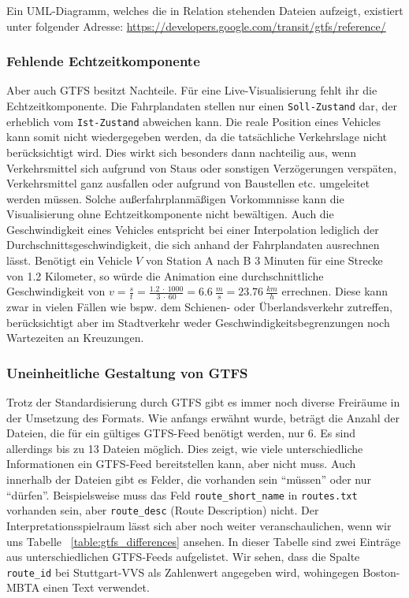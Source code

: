       Ein UML-Diagramm, welches die in Relation stehenden Dateien aufzeigt, existiert unter folgender Adresse: \url{https://developers.google.com/transit/gtfs/reference/} 

      \subsubsection*{Fehlende Echtzeitkomponente}
      \label{ssub:fehlende_echtzeitkomponente}
        Aber auch GTFS besitzt Nachteile. Für eine Live-Visualisierung fehlt ihr die Echtzeitkomponente. Die Fahrplandaten stellen nur einen \texttt{Soll-Zustand} dar, der erheblich vom \texttt{Ist-Zustand} abweichen kann. Die reale Position eines Vehicles kann somit nicht wiedergegeben werden, da die tatsächliche Verkehrslage nicht berücksichtigt wird. Dies wirkt sich besonders dann nachteilig aus, wenn Verkehrsmittel sich aufgrund von Staus oder sonstigen Verzögerungen verspäten, Verkehrsmittel ganz ausfallen oder aufgrund von Baustellen etc. umgeleitet werden müssen. Solche außerfahrplanmäßigen Vorkommnisse kann die Visualisierung ohne Echtzeitkomponente nicht bewältigen.
        Auch die Geschwindigkeit eines Vehicles entspricht bei einer Interpolation lediglich der Durchschnittsgeschwindigkeit, die sich anhand der Fahrplandaten ausrechnen lässt. Benötigt ein Vehicle $V$ von Station A nach B 3 Minuten für eine Strecke von 1.2 Kilometer, so würde die Animation eine durchschnittliche Geschwindigkeit von $v = \frac{s}{t} = \frac{1.2 \: \cdot \: 1000}{3 \: \cdot \: 60} = 6.6 \: \frac{m}{s} = 23.76 \: \frac{km}{h}$ errechnen. Diese kann zwar in vielen Fällen wie bspw. dem Schienen- oder Überlandsverkehr zutreffen, berücksichtigt aber im Stadtverkehr weder Geschwindigkeitsbegrenzungen noch Wartezeiten an Kreuzungen. 


      \subsubsection*{Uneinheitliche Gestaltung von GTFS}
      \label{ssub:uneinheitliche_gestaltung_von_gtfs}
        Trotz der Standardisierung durch GTFS gibt es immer noch diverse Freiräume in der Umsetzung des Formats. Wie anfangs erwähnt wurde, beträgt die Anzahl der Dateien, die für ein gültiges GTFS-Feed benötigt werden, nur 6. Es sind allerdings bis zu 13 Dateien möglich. Dies zeigt, wie viele unterschiedliche Informationen ein GTFS-Feed bereitstellen kann, aber nicht muss. 
        Auch innerhalb der Dateien gibt es Felder, die vorhanden sein "`müssen"' oder nur "`dürfen"'. Beispielsweise muss das Feld \texttt{route\_short\_name} in \texttt{routes.txt} vorhanden sein, aber \texttt{route\_desc} (Route Description) nicht. Der Interpretationsspielraum lässt sich aber noch weiter veranschaulichen, wenn wir uns Tabelle ~\ref{table:gtfs_differences} ansehen. In dieser Tabelle sind zwei Einträge aus unterschiedlichen GTFS-Feeds aufgelistet.
        Wir sehen, dass die Spalte \texttt{route\_id} bei Stuttgart-VVS als Zahlenwert angegeben wird, wohingegen Boston-MBTA einen Text verwendet.


